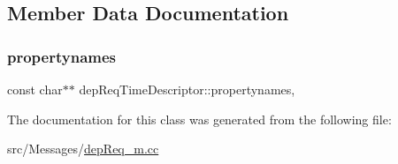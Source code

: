 \subsection{Member Data Documentation}
\mbox{\label{classdep_req_time_descriptor_a8027018b5fe1aeb72652563cd2a9f505}} 
\subsubsection{\texorpdfstring{propertynames}{propertynames}}
{\footnotesize\ttfamily const char$\ast$$\ast$ dep\+Req\+Time\+Descriptor\+::propertynames\hspace{0.3cm}{\ttfamily [mutable]}, {\ttfamily [private]}}



The documentation for this class was generated from the following file\+:\begin{DoxyCompactItemize}
\item 
src/\+Messages/\hyperlink{dep_req__m_8cc}{dep\+Req\+\_\+m.\+cc}\end{DoxyCompactItemize}
